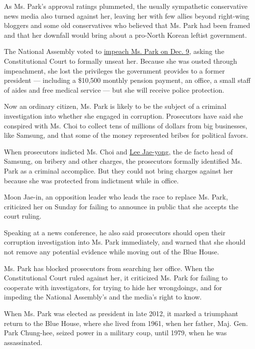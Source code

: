 As Ms. Park's approval ratings plummeted, the usually sympathetic
conservative news media also turned against her, leaving her with few
allies beyond right-wing bloggers and some old conservatives who
believed that Ms. Park had been framed and that her downfall would bring
about a pro-North Korean leftist government.

The National Assembly voted to
\href{https://www.nytimes3xbfgragh.onion/2016/12/09/world/asia/south-korea-president-park-geun-hye-impeached.html}{impeach
Ms. Park on Dec. 9}, asking the Constitutional Court to formally unseat
her. Because she was ousted through impeachment, she lost the privileges
the government provides to a former president --- including a \$10,500
monthly pension payment, an office, a small staff of aides and free
medical service --- but she will receive police protection.

Now an ordinary citizen, Ms. Park is likely to be the subject of a
criminal investigation into whether she engaged in corruption.
Prosecutors have said she conspired with Ms. Choi to collect tens of
millions of dollars from big businesses, like Samsung, and that some of
the money represented bribes for political favors.

When prosecutors indicted Ms. Choi and
\href{https://www.nytimes3xbfgragh.onion/2017/02/28/world/asia/lee-jae-yong-samsung.html}{Lee
Jae-yong}, the de facto head of Samsung, on bribery and other charges,
the prosecutors formally identified Ms. Park as a criminal accomplice.
But they could not bring charges against her because she was protected
from indictment while in office.

Moon Jae-in, an opposition leader who leads the race to replace Ms.
Park, criticized her on Sunday for failing to announce in public that
she accepts the court ruling.

Speaking at a news conference, he also said prosecutors should open
their corruption investigation into Ms. Park immediately, and warned
that she should not remove any potential evidence while moving out of
the Blue House.

Ms. Park has blocked prosecutors from searching her office. When the
Constitutional Court ruled against her, it criticized Ms. Park for
failing to cooperate with investigators, for trying to hide her
wrongdoings, and for impeding the National Assembly's and the media's
right to know.

When Ms. Park was elected as president in late 2012, it marked a
triumphant return to the Blue House, where she lived from 1961, when her
father, Maj. Gen. Park Chung-hee, seized power in a military coup, until
1979, when he was assassinated.

